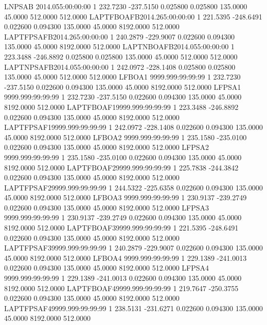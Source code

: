 LNPSAB    2014.055:00:00:00  1    232.7230   -237.5150    0.025800    0.025800    135.0000     45.0000    512.0000    512.0000
LAPTFBOAFB2014.265:00:00:00  1    221.5395   -248.6491    0.022600    0.094300    135.0000     45.0000   8192.0000    512.0000
LAPTFPSAFB2014.265:00:00:00  1    240.2879   -229.9007    0.022600    0.094300    135.0000     45.0000   8192.0000    512.0000
LAPTNBOAFB2014.055:00:00:00  1    223.3488   -246.8892    0.025800    0.025800    135.0000     45.0000    512.0000    512.0000
LAPTNPSAFB2014.055:00:00:00  1    242.0972   -228.1408    0.025800    0.025800    135.0000     45.0000    512.0000    512.0000
LFBOA1    9999.999:99:99:99  1    232.7230   -237.5150    0.022600    0.094300    135.0000     45.0000   8192.0000    512.0000
LFPSA1    9999.999:99:99:99  1    232.7230   -237.5150    0.022600    0.094300    135.0000     45.0000   8192.0000    512.0000
LAPTFBOAF19999.999:99:99:99  1    223.3488   -246.8892    0.022600    0.094300    135.0000     45.0000   8192.0000    512.0000
LAPTFPSAF19999.999:99:99:99  1    242.0972   -228.1408    0.022600    0.094300    135.0000     45.0000   8192.0000    512.0000
LFBOA2    9999.999:99:99:99  1    235.1580   -235.0100    0.022600    0.094300    135.0000     45.0000   8192.0000    512.0000
LFPSA2    9999.999:99:99:99  1    235.1580   -235.0100    0.022600    0.094300    135.0000     45.0000   8192.0000    512.0000
LAPTFBOAF29999.999:99:99:99  1    225.7838   -244.3842    0.022600    0.094300    135.0000     45.0000   8192.0000    512.0000
LAPTFPSAF29999.999:99:99:99  1    244.5322   -225.6358    0.022600    0.094300    135.0000     45.0000   8192.0000    512.0000
LFBOA3    9999.999:99:99:99  1    230.9137   -239.2749    0.022600    0.094300    135.0000     45.0000   8192.0000    512.0000
LFPSA3    9999.999:99:99:99  1    230.9137   -239.2749    0.022600    0.094300    135.0000     45.0000   8192.0000    512.0000
LAPTFBOAF39999.999:99:99:99  1    221.5395   -248.6491    0.022600    0.094300    135.0000     45.0000   8192.0000    512.0000
LAPTFPSAF39999.999:99:99:99  1    240.2879   -229.9007    0.022600    0.094300    135.0000     45.0000   8192.0000    512.0000
LFBOA4    9999.999:99:99:99  1    229.1389   -241.0013    0.022600    0.094300    135.0000     45.0000   8192.0000    512.0000
LFPSA4    9999.999:99:99:99  1    229.1389   -241.0013    0.022600    0.094300    135.0000     45.0000   8192.0000    512.0000
LAPTFBOAF49999.999:99:99:99  1    219.7647   -250.3755    0.022600    0.094300    135.0000     45.0000   8192.0000    512.0000
LAPTFPSAF49999.999:99:99:99  1    238.5131   -231.6271    0.022600    0.094300    135.0000     45.0000   8192.0000    512.0000
